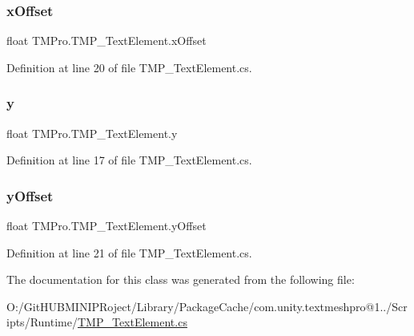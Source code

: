 \subsubsection{\texorpdfstring{xOffset}{xOffset}}
{\footnotesize\ttfamily float T\+M\+Pro.\+T\+M\+P\+\_\+\+Text\+Element.\+x\+Offset}



Definition at line 20 of file T\+M\+P\+\_\+\+Text\+Element.\+cs.

\mbox{\label{class_t_m_pro_1_1_t_m_p___text_element_a8e2cedf1184993e8d566bc0b95b8532e}} 
\subsubsection{\texorpdfstring{y}{y}}
{\footnotesize\ttfamily float T\+M\+Pro.\+T\+M\+P\+\_\+\+Text\+Element.\+y}



Definition at line 17 of file T\+M\+P\+\_\+\+Text\+Element.\+cs.

\mbox{\label{class_t_m_pro_1_1_t_m_p___text_element_a69b38f4991fe27916600dc332326ec80}} 
\subsubsection{\texorpdfstring{yOffset}{yOffset}}
{\footnotesize\ttfamily float T\+M\+Pro.\+T\+M\+P\+\_\+\+Text\+Element.\+y\+Offset}



Definition at line 21 of file T\+M\+P\+\_\+\+Text\+Element.\+cs.



The documentation for this class was generated from the following file\+:\begin{DoxyCompactItemize}
\item 
O\+:/\+Git\+H\+U\+B\+M\+I\+N\+I\+P\+Roject/\+Library/\+Package\+Cache/com.\+unity.\+textmeshpro@1../\+Scripts/\+Runtime/\mbox{\hyperlink{_t_m_p___text_element_8cs}{T\+M\+P\+\_\+\+Text\+Element.\+cs}}\end{DoxyCompactItemize}
